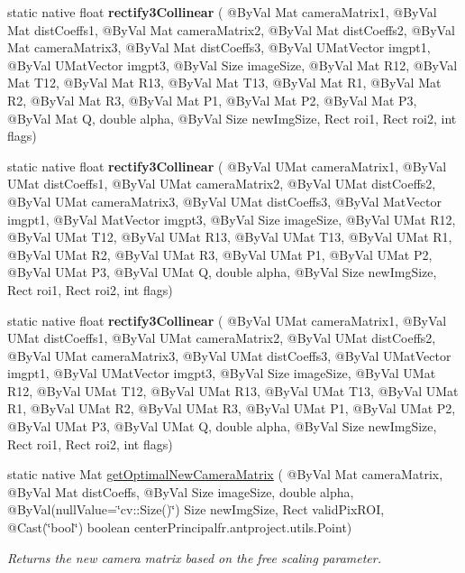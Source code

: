 \begin{DoxyCompactItemize}
\item 
static native float {\bfseries rectify3\+Collinear} ( @By\+Val Mat camera\+Matrix1, @By\+Val Mat dist\+Coeffs1, @By\+Val Mat camera\+Matrix2, @By\+Val Mat dist\+Coeffs2, @By\+Val Mat camera\+Matrix3, @By\+Val Mat dist\+Coeffs3, @By\+Val U\+Mat\+Vector imgpt1, @By\+Val U\+Mat\+Vector imgpt3, @By\+Val Size image\+Size, @By\+Val Mat R12, @By\+Val Mat T12, @By\+Val Mat R13, @By\+Val Mat T13, @By\+Val Mat R1, @By\+Val Mat R2, @By\+Val Mat R3, @By\+Val Mat P1, @By\+Val Mat P2, @By\+Val Mat P3, @By\+Val Mat Q, double alpha, @By\+Val Size new\+Img\+Size, Rect roi1, Rect roi2, int flags)
\item 
static native float {\bfseries rectify3\+Collinear} ( @By\+Val U\+Mat camera\+Matrix1, @By\+Val U\+Mat dist\+Coeffs1, @By\+Val U\+Mat camera\+Matrix2, @By\+Val U\+Mat dist\+Coeffs2, @By\+Val U\+Mat camera\+Matrix3, @By\+Val U\+Mat dist\+Coeffs3, @By\+Val Mat\+Vector imgpt1, @By\+Val Mat\+Vector imgpt3, @By\+Val Size image\+Size, @By\+Val U\+Mat R12, @By\+Val U\+Mat T12, @By\+Val U\+Mat R13, @By\+Val U\+Mat T13, @By\+Val U\+Mat R1, @By\+Val U\+Mat R2, @By\+Val U\+Mat R3, @By\+Val U\+Mat P1, @By\+Val U\+Mat P2, @By\+Val U\+Mat P3, @By\+Val U\+Mat Q, double alpha, @By\+Val Size new\+Img\+Size, Rect roi1, Rect roi2, int flags)
\item 
static native float {\bfseries rectify3\+Collinear} ( @By\+Val U\+Mat camera\+Matrix1, @By\+Val U\+Mat dist\+Coeffs1, @By\+Val U\+Mat camera\+Matrix2, @By\+Val U\+Mat dist\+Coeffs2, @By\+Val U\+Mat camera\+Matrix3, @By\+Val U\+Mat dist\+Coeffs3, @By\+Val U\+Mat\+Vector imgpt1, @By\+Val U\+Mat\+Vector imgpt3, @By\+Val Size image\+Size, @By\+Val U\+Mat R12, @By\+Val U\+Mat T12, @By\+Val U\+Mat R13, @By\+Val U\+Mat T13, @By\+Val U\+Mat R1, @By\+Val U\+Mat R2, @By\+Val U\+Mat R3, @By\+Val U\+Mat P1, @By\+Val U\+Mat P2, @By\+Val U\+Mat P3, @By\+Val U\+Mat Q, double alpha, @By\+Val Size new\+Img\+Size, Rect roi1, Rect roi2, int flags)
\item 
static native Mat \hyperlink{group__calib3d_ga70615047cb056a5e3787ce151ddef307}{get\+Optimal\+New\+Camera\+Matrix} ( @By\+Val Mat camera\+Matrix, @By\+Val Mat dist\+Coeffs, @By\+Val Size image\+Size, double alpha, @By\+Val(null\+Value=\char`\"{}cv\+::\+Size()\char`\"{}) Size new\+Img\+Size, Rect valid\+Pix\+R\+OI, @Cast(\char`\"{}bool\char`\"{}) boolean center\+Principal\+fr.antproject.utils.Point)
\begin{DoxyCompactList}\small\item\em Returns the new camera matrix based on the free scaling parameter. \end{DoxyCompactList}\item 

\end{DoxyCompactItemize}
